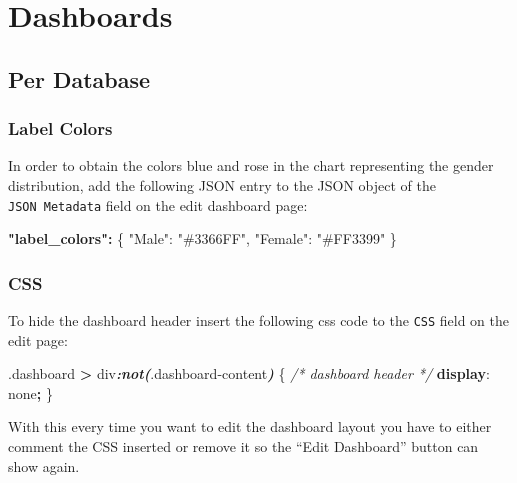 \documentclass[
]{book}
\newenvironment{Shaded}{\begin{snugshade}}{\end{snugshade}}
\newcommand{\CommentTok}[1]{\textcolor[rgb]{0.56,0.35,0.01}{\textit{#1}}}
\newcommand{\DataTypeTok}[1]{\textcolor[rgb]{0.13,0.29,0.53}{#1}}
\newcommand{\DecValTok}[1]{\textcolor[rgb]{0.00,0.00,0.81}{#1}}
\newcommand{\ErrorTok}[1]{\textcolor[rgb]{0.64,0.00,0.00}{\textbf{#1}}}
\newcommand{\FunctionTok}[1]{\textcolor[rgb]{0.00,0.00,0.00}{#1}}
\newcommand{\InformationTok}[1]{\textcolor[rgb]{0.56,0.35,0.01}{\textbf{\textit{#1}}}}
\newcommand{\KeywordTok}[1]{\textcolor[rgb]{0.13,0.29,0.53}{\textbf{#1}}}
\newcommand{\NormalTok}[1]{#1}
\newcommand{\OperatorTok}[1]{\textcolor[rgb]{0.81,0.36,0.00}{\textbf{#1}}}
\newcommand{\StringTok}[1]{\textcolor[rgb]{0.31,0.60,0.02}{#1}}
\begin{document}
\hypertarget{dashboards}{%
\chapter{Dashboards}\label{dashboards}}

\hypertarget{PerDatabaseDashboard}{%
\section{Per Database}\label{PerDatabaseDashboard}}

\hypertarget{label-colors}{%
\subsection*{Label Colors}\label{label-colors}}

In order to obtain the colors blue and rose in the chart representing the gender distribution,
add the following JSON entry to the JSON object of the \texttt{JSON\ Metadata} field on the edit dashboard page:

\begin{Shaded}
\begin{Highlighting}[]
\ErrorTok{"label\_colors":} \FunctionTok{\{}
    \DataTypeTok{"Male"}\FunctionTok{:} \StringTok{"\#3366FF"}\FunctionTok{,} 
    \DataTypeTok{"Female"}\FunctionTok{:} \StringTok{"\#FF3399"}
\FunctionTok{\}}
\end{Highlighting}
\end{Shaded}

\hypertarget{css}{%
\subsection*{CSS}\label{css}}

To hide the dashboard header insert the following css code to the \texttt{CSS} field on the edit page:

\begin{Shaded}
\begin{Highlighting}[]
\FunctionTok{.dashboard} \OperatorTok{\textgreater{}}\NormalTok{ div}\InformationTok{:not(}\FunctionTok{.dashboard{-}content}\InformationTok{)}\NormalTok{ \{  }\CommentTok{/* dashboard header */}
  \KeywordTok{display}\NormalTok{: }\DecValTok{none}\OperatorTok{;}
\NormalTok{\}}
\end{Highlighting}
\end{Shaded}

With this every time you want to edit the dashboard layout you have to either comment the CSS inserted
or remove it so the ``Edit Dashboard'' button can show again.
\end{document}
